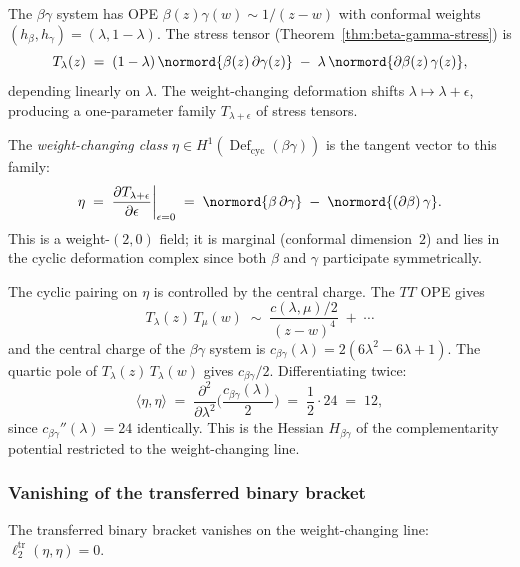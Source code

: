The $\beta\gamma$ system has OPE
$\beta(z)\gamma(w) \sim 1/(z-w)$ with conformal weights
$(h_\beta, h_\gamma) = (\lambda, 1-\lambda)$. The stress tensor
(Theorem~\ref{thm:beta-gamma-stress}) is
\[
 T_\lambda(z)
 \;=\;
 (1-\lambda)\,\normord{\beta(z)\,\partial\gamma(z)}
 \;-\;
 \lambda\,\normord{\partial\beta(z)\,\gamma(z)},
\]
depending linearly on $\lambda$. The weight-changing deformation
shifts $\lambda \mapsto \lambda + \epsilon$, producing a one-parameter
family $T_{\lambda+\epsilon}$ of stress tensors.

\begin{definition}
\label{def:betagamma-eta-marginal}
The \emph{weight-changing class}
$\eta \in H^1(\operatorname{Def}_{\mathrm{cyc}}(\beta\gamma))$
is the tangent vector to this family:
\[
 \eta
 \;=\;
 \frac{\partial T_{\lambda+\epsilon}}{\partial \epsilon}
 \bigg|_{\epsilon=0}
 \;=\;
 \normord{\beta\,\partial\gamma}
 \;-\;
 \normord{(\partial\beta)\,\gamma}.
\]
This is a weight-$(2,0)$ field; it is marginal (conformal dimension~$2$)
and lies in the cyclic deformation complex since both $\beta$ and
$\gamma$ participate symmetrically.
\end{definition}

The cyclic pairing on $\eta$ is controlled by the central charge.
The $TT$ OPE gives
\[
 T_\lambda(z)\,T_\mu(w)
 \;\sim\;
 \frac{c(\lambda,\mu)/2}{(z-w)^4}
 \;+\; \cdots
\]
and the central charge of the $\beta\gamma$ system is
$c_{\beta\gamma}(\lambda) = 2(6\lambda^2 - 6\lambda + 1)$.
The quartic pole of $T_\lambda(z)\,T_\lambda(w)$ gives
$c_{\beta\gamma}/2$. Differentiating twice:
\begin{equation}\label{eq:betagamma-eta-pairing}
 \langle \eta, \eta \rangle
 \;=\;
 \frac{\partial^2}{\partial\lambda^2}
 \biggl(\frac{c_{\beta\gamma}(\lambda)}{2}\biggr)
 \;=\;
 \frac{1}{2}\cdot 24
 \;=\; 12,
\end{equation}
since $c_{\beta\gamma}''(\lambda) = 24$ identically. This is the
Hessian $H_{\beta\gamma}$ of the complementarity potential restricted
to the weight-changing line.

\subsubsection{Vanishing of the transferred binary bracket}
\label{sssec:betagamma-m2-vanishing}

\begin{lemma}[$\ell_2^{\mathrm{tr}}(\eta,\eta) = 0$;
\ClaimStatusProvedHere]
\label{lem:betagamma-ell2-vanishing}
The transferred binary bracket vanishes on the weight-changing line:
$\ell_2^{\mathrm{tr}}(\eta,\eta) = 0$.
\end{lemma}

